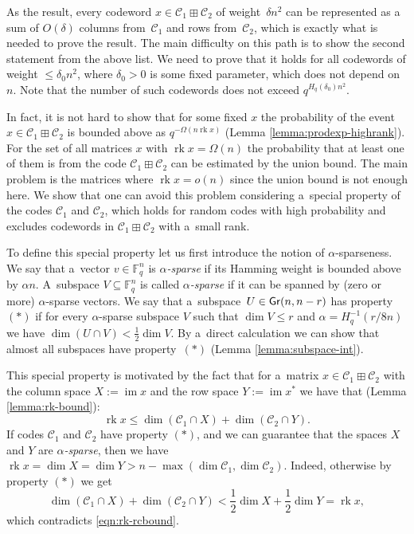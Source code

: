 \documentclass[11pt]{article}
\let\le\leqslant
\theoremstyle{plain}
\theoremstyle{definition}
\theoremstyle{remark}
\newcommand{\cC}{\mathcal{C}}
\newcommand{\F}{\mathbb{F}}
\DeclareMathOperator{\rk}{rk}
\DeclareMathOperator{\im}{im}
\newcommand{\Gr}{{\sf Gr}}
\begin{document}
As the result, every codeword $x\in \cC_1\boxplus \cC_2$ of weight~$\delta n^2$ can be represented as a sum of $O(\delta)$ columns from~$\cC_1$ and rows from~$\cC_2$, which is exactly what is needed to prove the result.
The main difficulty on this path is to show the second statement from the above list. We need to prove that it holds for all codewords of weight $\le \delta_0 n^2$, where  $\delta_0>0$ is some fixed parameter, which does not depend on~$n$. Note that the number of such codewords does not exceed $q^{H_q(\delta_0)n^2}$. 

In fact, it is not hard to show that for some fixed $x$ the probability of the event $x\in \cC_1\boxplus \cC_2$ is bounded above as  $q^{-\Omega(n\rk x)}$ (Lemma \ref{lemma:prodexp-highrank}).
For the set of all matrices $x$ with $\rk x = \Omega(n)$ the probability that at least one of them is from the code $\cC_1\boxplus\cC_2$ can be estimated by the union bound. 
The main problem is the matrices where $\rk x=o(n)$ since the union bound is not enough here. 
We show that one can avoid this problem considering a~special property of the codes $\cC_1$ and $\cC_2$, which holds for random codes with high probability and excludes codewords in $\cC_1\boxplus\cC_2$ with a~small rank. 

To define this special property let us first introduce the notion of $\alpha$-sparseness. We say that a~vector $v\in \F_q^n$ is \emph{$\alpha$-sparse} if its Hamming weight is bounded above by $\alpha n$. A~subspace $V\subseteq \F_q^n$ is called \emph{$\alpha$-sparse} if it can be spanned by (zero or more) $\alpha$-sparse vectors. 
We say that a~subspace~$U\in \Gr(n,n-r)$ has property $(*)$ if for every $\alpha$-sparse subspace $V$ such that $\dim V\le r$ and $\alpha=H_q^{-1}(r/8n)$ we have $\dim (U\cap V)<\frac12\dim V$. By a~direct calculation we can show that almost all subspaces have property~$(*)$ (Lemma \ref{lemma:subspace-int}).

This special property is motivated by the fact that for a~matrix $x\in \cC_1\boxplus \cC_2$ with the column space $X:=\im x$ and the row space  $Y:=\im x^*$ we have that (Lemma \ref{lemma:rk-bound}):
\begin{equation}\label{eqn:rk-rcbound}
    \rk x\le \dim(\cC_1\cap X)+\dim(\cC_2\cap Y).
\end{equation} 
If codes $\cC_1$ and $\cC_2$ have property $(*)$, and we can guarantee that the spaces $X$ and $Y$ are \emph{$\alpha$-sparse}, then we have $\rk x=\dim X=\dim Y>n-\max(\dim \cC_1,\dim \cC_2)$. Indeed, otherwise by property $(*)$ we get $$\dim(\cC_1\cap X)+\dim(\cC_2\cap Y)<\frac12\dim X+\frac12\dim Y=\rk x,$$ which contradicts \eqref{eqn:rk-rcbound}. 
\end{document}
